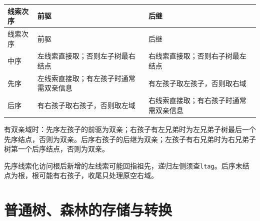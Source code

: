 \par\smallskip
\begin{wideblock}
{\fontsize{9.3}{12}\selectfont\setlength{\tabcolsep}{2.5pt}\setlength{\LTleft}{0pt}\setlength{\LTright}{0pt}
\begin{longtable}{@{}>{\raggedright\arraybackslash}p{}>{\raggedright\arraybackslash}p{}>{\raggedright\arraybackslash}p{}@{}}
\toprule
线索次序 & 前驱 & 后继 \\

\midrule\endfirsthead\toprule
线索次序 & 前驱 & 后继 \\

\midrule\endhead\bottomrule\endfoot
中序 & 左线索直接取；否则左子树最右结点 & 右线索直接取；否则右子树最左结点 \\

先序 & 左线索直接取；有左孩子时通常需双亲信息 & 有左孩子取左孩子，否则取右域 \\

后序 & 有右孩子取右孩子，否则取左域 & 右线索直接取；有右孩子时通常需双亲信息 \\

\end{longtable}}
\end{wideblock}
\par\smallskip

有双亲域时：先序左孩子的前驱为双亲；右孩子有左兄弟时为左兄弟子树最后一个先序结点，否则为双亲。后序右孩子的后继为双亲；左孩子有右兄弟时为右兄弟子树第一个后序结点，否则为双亲。

先序线索化访问根后新增的左线索可能回指祖先，递归左侧须查\texttt{ltag}。后序末结点为根，根可能有右孩子，收尾只处理原空右域。

\section{普通树、森林的存储与转换}\label{DS05-forest}

